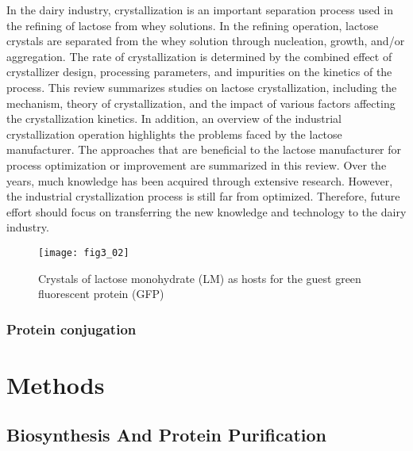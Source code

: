 \begin{refsection}
In the dairy industry, crystallization is an important separation
process used in the refining of lactose from whey solutions. In the refining
operation, lactose crystals are separated from the whey solution through
nucleation, growth, and/or aggregation. The rate of crystallization is
determined by the combined effect of crystallizer design, processing
parameters, and impurities on the kinetics of the process. This review
summarizes studies on lactose crystallization, including the mechanism, theory
of crystallization, and the impact of various factors affecting the
crystallization kinetics. In addition, an overview of the industrial
crystallization operation highlights the problems faced by the lactose
manufacturer. The approaches that are beneficial to the lactose manufacturer
for process optimization or improvement are summarized in this review. Over the
years, much knowledge has been acquired through extensive research. However,
the industrial crystallization process is still far from optimized. Therefore,
future effort should focus on transferring the new knowledge and technology to
the dairy industry.

\begin{figure}[h!] \centering \texttt{[image: fig3\_02]} 
    \caption[Crystals of lactose monohydrate (LM) as hosts for the guest green
    fluorescent protein (GFP)]{Crystals of lactose monohydrate (LM) as hosts
    for the guest green fluorescent protein (GFP)}
    \label{fig:lm-intro}
\end{figure}

\subsubsection{Protein conjugation}


\section{Methods}

\subsection{Biosynthesis And Protein Purification}


\end{refsection}
